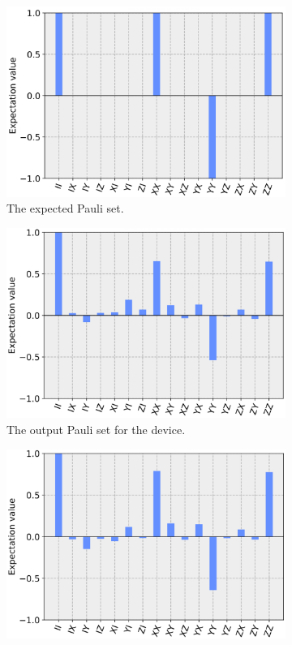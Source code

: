 \begin{figure}
	\begin{subfigure}{.5\textwidth} \centering %
		\includegraphics[width=.8\linewidth]{images/results/swap_pauli_sim.png}
		\caption{The expected Pauli set.}
		\label{fig:swap_pauli_sim}
	\end{subfigure} \newline
	\begin{subfigure}{.5\textwidth} \centering %
		\includegraphics[width=.8\linewidth]{images/results/swap_pauli_dev.png}
		\caption{The output Pauli set for the device.}
		\label{fig:swap_pauli_dev}
	\end{subfigure} \newline
	\begin{subfigure}{.5\textwidth} \centering %
		\includegraphics[width=.8\linewidth]{images/results/swap_pauli_cal.png}

\end{subfigure}
\end{figure}

